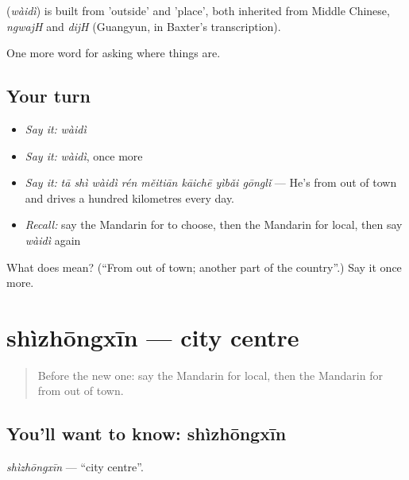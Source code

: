\begin{cousinweb}
\textbf{} (\emph{wàidì}) is built from  'outside' and  'place', both inherited from Middle Chinese, \emph{ngwajH} and \emph{dijH} (Guangyun, in Baxter's transcription).
\end{cousinweb}

\begin{grammarlens}[title={What you've built}]
One more word for asking where things are.
\end{grammarlens}

\subsection*{Your turn}
\begin{itemize}
\raggedright
  \item \emph{Say it:} \emph{wàidì}
  \item \emph{Say it:} \emph{wàidì}, once more
  \item \emph{Say it:} \emph{tā shì wàidì rén měitiān kāichē yìbǎi gōnglǐ} — He's from out of town and drives a hundred kilometres every day.
  \item \emph{Recall:} say the Mandarin for to choose, then the Mandarin for local, then say \emph{wàidì} again
\end{itemize}

\begin{tcolorbox}[breakable,colback=teal!4,colframe=teal!35!black,title={Before you move on}]
What does  mean? (\textquotedblleft{}From out of town; another part of the country\textquotedblright{}.) Say it once more.
\end{tcolorbox}
\section[shìzhōngxīn]{shìzhōngxīn — city centre}

\label{lesson:ZH-C211-shizhongxin}



\begin{quote}
Before the new one: say the Mandarin for local, then the Mandarin for from out of town.
\end{quote}

\subsection*{You'll want to know: shìzhōngxīn}
\emph{shìzhōngxīn} — \textquotedblleft{}city centre\textquotedblright{}.

